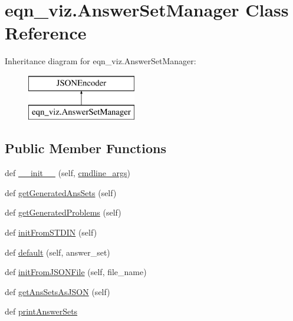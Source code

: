 \hypertarget{classeqn__viz_1_1_answer_set_manager}{}\section{eqn\+\_\+viz.\+Answer\+Set\+Manager Class Reference}
\label{classeqn__viz_1_1_answer_set_manager}
Inheritance diagram for eqn\+\_\+viz.\+Answer\+Set\+Manager\+:\begin{figure}[H]
\begin{center}
\leavevmode
\includegraphics[height=2.000000cm]{classeqn__viz_1_1_answer_set_manager}
\end{center}
\end{figure}
\subsection*{Public Member Functions}
\begin{DoxyCompactItemize}
\item 
def \hyperlink{classeqn__viz_1_1_answer_set_manager_a9bd9622d26fa24a188a825d2b5137b13}{\+\_\+\+\_\+init\+\_\+\+\_\+} (self, \hyperlink{classeqn__viz_1_1_answer_set_manager_a15d9c03574ab43af95dc420cb125df11}{cmdline\+\_\+args})
\item 
def \hyperlink{classeqn__viz_1_1_answer_set_manager_a66cb1f21deee1507810d80f670bcdeb7}{get\+Generated\+Ans\+Sets} (self)
\item 
def \hyperlink{classeqn__viz_1_1_answer_set_manager_a54a34f14351d91c57ca1a0fb5292959b}{get\+Generated\+Problems} (self)
\item 
def \hyperlink{classeqn__viz_1_1_answer_set_manager_ac9d5c0d89ad8693ed7c31df75d61c8c7}{init\+From\+S\+T\+D\+I\+N} (self)
\item 
def \hyperlink{classeqn__viz_1_1_answer_set_manager_a61acb8db5bc5cb6bdf9300016fc21a60}{default} (self, answer\+\_\+set)
\item 
def \hyperlink{classeqn__viz_1_1_answer_set_manager_a9ac22e2d51a183ee9ad9eeb928ab1a1c}{init\+From\+J\+S\+O\+N\+File} (self, file\+\_\+name)
\item 
def \hyperlink{classeqn__viz_1_1_answer_set_manager_a3e89932b2df88cc458570b1e88f587df}{get\+Ans\+Sets\+As\+J\+S\+O\+N} (self)
\item 
def \hyperlink{classeqn__viz_1_1_answer_set_manager_ae3c8a041865a03bb4d521a59064aaaf1}{print\+Answer\+Sets}
\end{DoxyCompactItemize}
